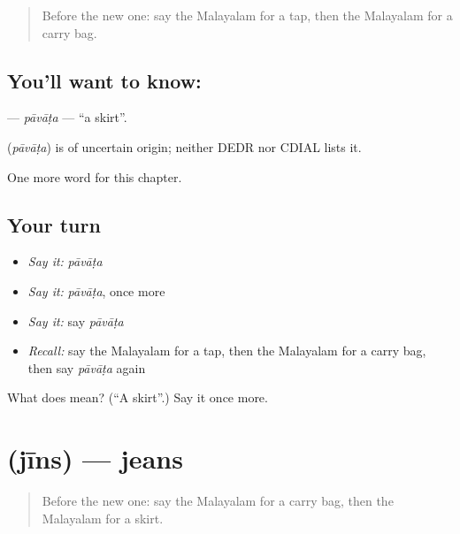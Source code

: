 \label{lesson:ML-C248-pavata}



\begin{quote}
Before the new one: say the Malayalam for a tap, then the Malayalam for a carry bag.
\end{quote}

\subsection*{You'll want to know: }
\textbf{} — \emph{pāvāṭa} — \textquotedblleft{}a skirt\textquotedblright{}.

\begin{cousinweb}
\textbf{} (\emph{pāvāṭa}) is of uncertain origin; neither DEDR nor CDIAL lists it.
\end{cousinweb}

\begin{grammarlens}[title={What you've built}]
One more word for this chapter.
\end{grammarlens}

\subsection*{Your turn}
\begin{itemize}
\raggedright
  \item \emph{Say it:} \emph{pāvāṭa}
  \item \emph{Say it:} \emph{pāvāṭa}, once more
  \item \emph{Say it:} say \emph{pāvāṭa}
  \item \emph{Recall:} say the Malayalam for a tap, then the Malayalam for a carry bag, then say \emph{pāvāṭa} again
\end{itemize}

\begin{tcolorbox}[breakable,colback=teal!4,colframe=teal!35!black,title={Before you move on}]
What does  mean? (\textquotedblleft{}A skirt\textquotedblright{}.) Say it once more.
\end{tcolorbox}
\section[\texorpdfstring{\ml{ജീൻസ്} (jīns)}{ജീൻസ് (jīns)}]{ (jīns) — jeans}

\label{lesson:ML-C248-jins}



\begin{quote}
Before the new one: say the Malayalam for a carry bag, then the Malayalam for a skirt.
\end{quote}

